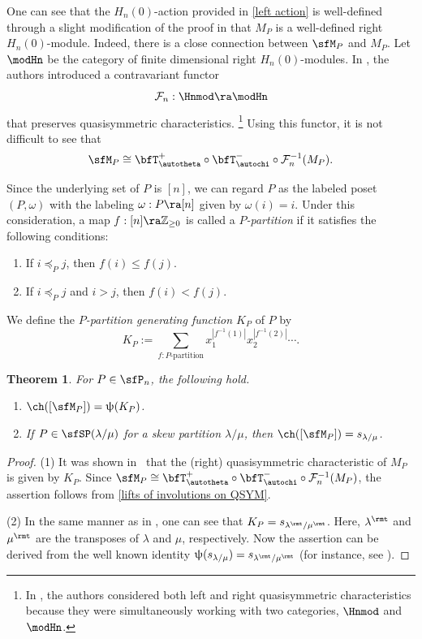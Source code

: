 \documentclass[12pt, reqno]{amsart}
\newtheorem{theorem}{Theorem}[section]
\theoremstyle{definition}
\numberwithin{equation}{section} \numberwithin{figure}{section}
\numberwithin{table}{section}
\def\Z{\mathbb Z}
\begin{document}
One can see that the $H_n(0)$-action provided in \cref{left action} is well-defined through a slight modification of the proof in \cite[Subsection 3.9]{02DHT} that $M_P$ is a well-defined right $H_n(0)$-module.
Indeed, there is a close connection between $\sfM_P$ and $M_P$.
Let $\modHn$ be the category of finite dimensional right $H_n(0)$-modules.
In \cite[Subsection 4.3]{23CKO}, the authors introduced a contravariant functor 
$$\mathcal{F}_n: \Hnmod \ra \modHn$$
that preserves quasisymmetric characteristics.
\footnote{In \cite[Subsection 4.3]{23CKO}, the authors considered both left and right quasisymmetric characteristics because they were simultaneously working with two categories, $\Hnmod$ and $\modHn$.}
Using this functor, it is not difficult to see that
\[
\sfM_P \cong \bfT^{+}_\autotheta \circ \bfT^{-}_\autochi \circ \mathcal{F}_n^{-1}(M_P).
\]




Since the underlying set of $P$ is $[n]$, we can regard $P$ as the labeled poset $(P, \omega)$ with the labeling $\omega: P \ra [n]$ given by $\omega(i) = i$.
Under this consideration, 
a map $f: [n] \ra \Z_{\ge 0}$ is called a \emph{$P$-partition} if it satisfies the following conditions:
\begin{enumerate}[label = {\rm (\arabic*)}]
\item 
If $i \preceq_P j$, then $f(i) \le f(j)$.
\item 
If $i \preceq_P j$ and $i > j$, then $f(i) < f(j)$.
\end{enumerate}
We define the \emph{$P$-partition generating function $K_P$}  of $P$ by
\[
K_{P} := \sum_{f:  \text{$P$-partition}} x_1^{|f^{-1}(1)|} x_2^{|f^{-1}(2)|} \cdots.
\]



\begin{theorem}\label{thm: char of Mp}
For $P \in \sfP_n$, the following hold. 
\begin{enumerate}[label = {\rm (\arabic*)}]
\item $\ch([\sfM_P]) = \uppsi(K_{P})$.
\item 
  If $P \in \sfSP(\lambda/\mu)$ for a skew partition $\lambda/\mu$, 
  then 
$\ch([\sfM_P]) = s_{\lambda/\mu}$.
\end{enumerate}
\end{theorem}
\begin{proof}
(1)
It was shown in~\cite[Theorem 3.21(i)]{02DHT} that the (right) quasisymmetric characteristic of $M_P$ is given by $K_P$. 
Since $\sfM_P \cong \bfT^{+}_\autotheta \circ \bfT^{-}_\autochi \circ \mathcal{F}_n^{-1}(M_P)$, the assertion follows from \cref{lifts of involutions on QSYM}.


(2)
In the same manner as in \cite[Subsection 7.19]{99Stanley}, one can see that $K_P = s_{\lambda^\rmt/\mu^\rmt}$.
Here, $\lambda^\rmt$ and $\mu^\rmt$ are the transposes of $\lambda$ and $\mu$, respectively.
Now the assertion can be derived from the well known identity 
$\uppsi(s_{\lambda/\mu}) = s_{\lambda^\rmt / \mu^\rmt}$
(for instance, see \cite[Subsection 3.6]{13LMvW}).
\end{proof}
\end{document}
